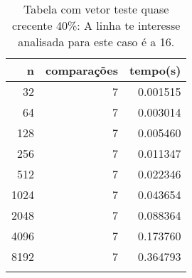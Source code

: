 \begin{table}[ht]
\centering
\begin{tabular}{rrr} \toprule
        n &    comparações &       tempo(s) \\ \midrule
      32  &              7 &      0.001515 \\
      64  &              7 &      0.003014 \\
     128  &              7 &      0.005460 \\
     256  &              7 &      0.011347 \\
     512  &              7 &      0.022346 \\
    1024  &              7 &      0.043654 \\
    2048  &              7 &      0.088364 \\
    4096  &              7 &      0.173760 \\
    8192  &              7 &      0.364793 \\
\bottomrule\addlinespace
\end{tabular}
\caption{Tabela com vetor teste quase crecente 40\%: A linha te interesse analisada para este caso é a 16.}
\label{tab:radixsortQuaseCresc40}
\end{table}
